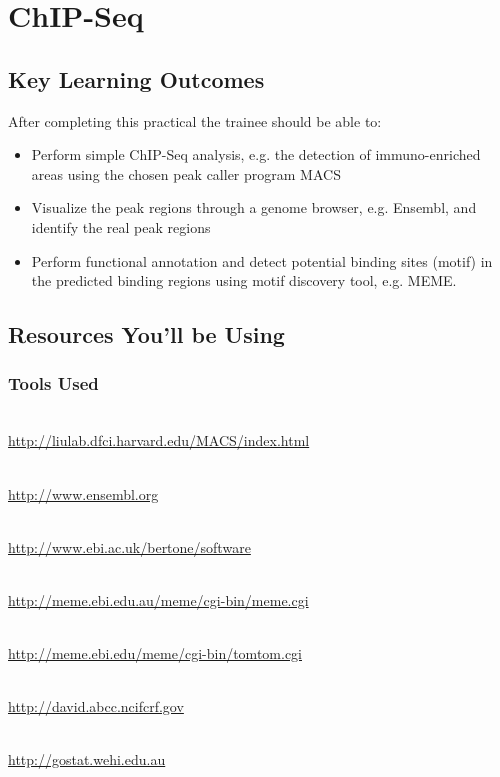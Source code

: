 \renewcommand{\moduleTitle}{ChIP-Seq}
\renewcommand{\moduleAuthors}{%
  Remco Loos, EMBL-EBI \mailto{remco@ebi.ac.uk} \\
  Myrto Kostadima \mailto{kostadim@ebi.ac.uk}
} \renewcommand{\moduleContributions}{%
  Xi Li \mailto{sean.li@csiro.au}%
}

\chapter{\moduleTitle}
\newpage

\section{Key Learning Outcomes}

After completing this practical the trainee should be able to:
\begin{itemize}
  \item Perform simple ChIP-Seq analysis, e.g. the detection of immuno-enriched areas using the chosen peak caller program MACS
  \item Visualize the peak regions through a genome browser, e.g. Ensembl, and identify the real peak regions
  \item Perform functional annotation and detect potential binding sites (motif) in the predicted binding regions using motif discovery tool, e.g. MEME.
\end{itemize}

\section{Resources You'll be Using}
 
\subsection{Tools Used}
\begin{description}[style=multiline,labelindent=0cm,align=left,leftmargin=0.5cm]
  \item[MACS]\hfill\\
  	\url{http://liulab.dfci.harvard.edu/MACS/index.html}
  \item[Ensembl]\hfill\\
  	\url{http://www.ensembl.org}
  \item[PeakAnalyzer]\hfill\\
  	\url{http://www.ebi.ac.uk/bertone/software}
  \item[MEME]\hfill\\
  	\url{http://meme.ebi.edu.au/meme/cgi-bin/meme.cgi}
  \item[TOMTOM]\hfill\\
  	\url{http://meme.ebi.edu/meme/cgi-bin/tomtom.cgi}  
  \item[DAVID]\hfill\\
  	\url{http://david.abcc.ncifcrf.gov}
  \item[GOstat]\hfill\\
    \url{http://gostat.wehi.edu.au}
\end{description}

